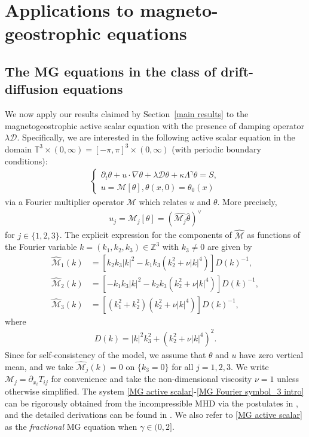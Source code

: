 \documentclass[reqno]{amsart}%
\theoremstyle{definition}
\theoremstyle{remark}
\numberwithin{equation}{section}
\newcommand{\1}{\mathbf{1}}
\newcommand{\Z}{\mathbb Z}
\numberwithin{equation}{section}
\numberwithin{theorem}{section}
\numberwithin{figure}{section}
\begin{document}
\section{Applications to magneto-geostrophic equations}\label{Applications to magneto-geostrophic equations section}

\subsection{The MG equations in the class of drift-diffusion equations}\label{MG equations in the class of drift-diffusion equations}

We now apply our results claimed by Section~\ref{main results} to the magnetogeostrophic active scalar equation with the presence of damping operator $\lambda\mathcal{D}$. Specifically, we are interested in the following active scalar equation in the domain $\mathbb{T}^3\times(0,\infty)=[-\pi,\pi]^3\times(0,\infty)$ (with periodic boundary conditions):
\begin{align}
\label{MG active scalar} \left\{ \begin{array}{l}
\partial_t\theta+u\cdot\nabla\theta+\lambda\mathcal{D}\theta+\kappa\Lambda^{\gamma}\theta=S, \\
u=\mathcal{M}[\theta],\theta(x,0)=\theta_0(x)
\end{array}\right.
\end{align}
via a Fourier multiplier operator $\mathcal{M}$ which relates $u$ and $\theta$. More precisely,
\begin{align}\label{def of u by Fourier transform}
u_j=\mathcal{M}_j [\theta]=(\widehat{\mathcal{M}_j}\hat\theta)^\vee
\end{align}
for $j\in\{1,2,3\}$. The explicit expression for the components of $\widehat{\mathcal{M}}$ as functions of the Fourier variable $k=(k_1,k_2,k_3)\in\Z^3$ with $k_3\neq0$ are given by 
\begin{align}
\widehat{\mathcal{M}}_1(k)&=[k_2k_3|k|^2-k_1k_3(k_2^2+\nu|k|^4)]D(k)^{-1},\label{MG Fourier symbol_1 intro}\\
\widehat{\mathcal{M}}_2(k)&=[-k_1k_3|k|^2-k_2k_3(k_2^2+\nu|k|^4)]D(k)^{-1},\label{MG Fourier symbol_2 intro}\\
\widehat{\mathcal{M}}_3(k)&=[(k_1^2+k_2^2)(k_2^2+\nu|k|^4)]D(k)^{-1},\label{MG Fourier symbol_3 intro}
\end{align}
where
\begin{align*}
D(k)=|k|^2k_3^2+(k_2^2+\nu|k|^4)^2.
\end{align*}
Since for self-consistency of the model, we assume that $\theta$ and $u$ have zero vertical mean, and we take $\widehat{\mathcal{M}}_j(k) = 0$ on $\{k_3=0\}$ for all $j=1,2,3$. We write $\mathcal{M}_j=\partial_{x_i}T_{ij}$ for convenience and take the non-dimensional viscosity $\nu=1$ unless otherwise simplified. The system \eqref{MG active scalar}-\eqref{MG Fourier symbol_3 intro} can be rigorously obtained from the incompressible MHD via the postulates in \cite{ML94}, and the detailed derivations can be found in \cite{FV11a, FRV12}. We also refer to \eqref{MG active scalar} as the {\it fractional} MG equation when $\gamma\in(0,2]$.
\end{document}
